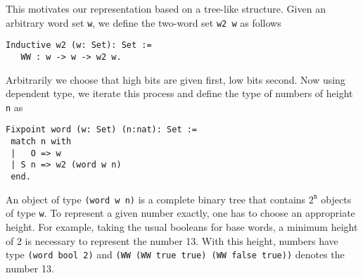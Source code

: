 This motivates our representation based on a tree-like structure. 
Given an arbitrary word set {\tt w}, we define the two-word 
set {\tt w2 w} as follows 
\begin{verbatim}
Inductive w2 (w: Set): Set :=  
   WW : w -> w -> w2 w.
\end{verbatim}
Arbitrarily we choose that high bits are given first, low bits
second. Now using dependent type, we iterate this process and define
the type of numbers of height {\tt n} as
\begin{verbatim}
Fixpoint word (w: Set) (n:nat): Set :=
 match n with
 |   O => w
 | S n => w2 (word w n)
 end.
\end{verbatim}
An object of type {\tt (word w n)} is a complete binary tree that
contains $2^\texttt{n}$ objects of type {\tt w}.
To represent a given number exactly, one has to choose an appropriate height.
For example, taking the usual booleans for base words, a minimum
height of 2 is necessary to represent the number 13. With this height, 
numbers have type {\tt (word bool 2)} and 
{\tt (WW (WW true true) (WW false true))} denotes the number 13.

